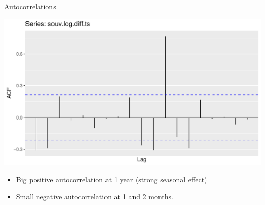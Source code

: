 \documentclass[ignorenonframetext,]{beamer}
\newenvironment{Shaded}{\begin{snugshade}}{\end{snugshade}}
\newcommand{\DataTypeTok}[1]{\textcolor[rgb]{0.13,0.29,0.53}{#1}}
\newcommand{\KeywordTok}[1]{\textcolor[rgb]{0.13,0.29,0.53}{\textbf{#1}}}
\newcommand{\NormalTok}[1]{#1}
\newcommand{\OperatorTok}[1]{\textcolor[rgb]{0.81,0.36,0.00}{\textbf{#1}}}
\newcommand{\StringTok}[1]{\textcolor[rgb]{0.31,0.60,0.02}{#1}}
\providecommand{\tightlist}{%
  \setlength{\itemsep}{0pt}\setlength{\parskip}{0pt}}
\begin{document}
\begin{frame}[fragile]{Autocorrelations}
\protect\hypertarget{autocorrelations}{}

\begin{Shaded}
\end{Shaded}

\includegraphics{figure/unnamed-chunk-39-1.pdf}

\begin{itemize}
\tightlist
\item
  Big positive autocorrelation at 1 year (strong seasonal effect)
\item
  Small negative autocorrelation at 1 and 2 months.
\end{itemize}

\end{frame}
\end{document}
